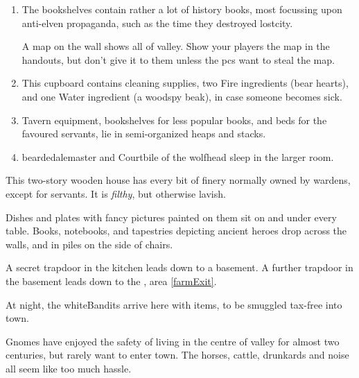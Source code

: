 \begin{multicols}{2}
\begin{enumerate}
  \item
  \label{horseUpstairs}
  The bookshelves contain rather a lot of history books, most focussing upon anti-elven propaganda, such as the time they destroyed \gls{lostcity}.

  A map on the wall shows all of \gls{valley}.
  Show your players the map in the handouts, but don't give it to them unless the \glspl{pc} want to steal the map.
  \item
  \label{horseCupboard}
  This cupboard contains cleaning supplies, two Fire \glspl{ingredient} (bear hearts), and one Water \gls{ingredient} (a woodspy beak), in case someone becomes sick.
  \item
  \label{horseSideRoom}
  Tavern equipment, bookshelves for less popular books, and beds for the favoured servants, lie in semi-organized heaps and stacks.
  \item
  \label{wolfRoom}
  \Gls{beardedalemaster} and Courtbile of the \gls{wolfhead} sleep in the larger room.%
\end{enumerate}



This two-story wooden house has every bit of finery normally owned by \glspl{warden}, except for servants.
It is \emph{filthy}, but otherwise lavish.

\begin{boxtext}
  Dishes and plates with fancy pictures painted on them sit on and under every table.
  Books, notebooks, and tapestries depicting ancient heroes drop across the walls, and in piles on the side of chairs.
\end{boxtext}

A secret trapdoor in the kitchen leads down to a basement.
A further trapdoor in the basement leads down to the , area \vref{farmExit}.

At night, the \gls{whiteBandits} arrive here with items, to be smuggled tax-free into \gls{town}.



Gnomes have enjoyed the safety of living in the centre of \gls{valley} for almost two centuries, but rarely want to enter \gls{town}.
The horses, cattle, drunkards and noise all seem like too much hassle.


\end{multicols}
